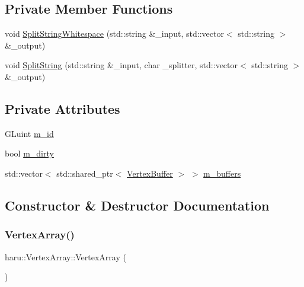 \subsection*{Private Member Functions}
\begin{DoxyCompactItemize}
\item 
void \mbox{\hyperlink{classharu_1_1_vertex_array_a4881c24fdca7f802456d1b8823a0c4ce}{Split\+String\+Whitespace}} (std\+::string \&\+\_\+input, std\+::vector$<$ std\+::string $>$ \&\+\_\+output)
\item 
void \mbox{\hyperlink{classharu_1_1_vertex_array_a8ca455fffbc9f554851fe18eb8a26bfa}{Split\+String}} (std\+::string \&\+\_\+input, char \+\_\+splitter, std\+::vector$<$ std\+::string $>$ \&\+\_\+output)
\end{DoxyCompactItemize}
\subsection*{Private Attributes}
\begin{DoxyCompactItemize}
\item 
G\+Luint \mbox{\hyperlink{classharu_1_1_vertex_array_a61e6c2025f2bb9da20280c6b607e4c22}{m\+\_\+id}}
\item 
bool \mbox{\hyperlink{classharu_1_1_vertex_array_a7cc151adcf4133de6d7130e206e08b9d}{m\+\_\+dirty}}
\item 
std\+::vector$<$ std\+::shared\+\_\+ptr$<$ \mbox{\hyperlink{classharu_1_1_vertex_buffer}{Vertex\+Buffer}} $>$ $>$ \mbox{\hyperlink{classharu_1_1_vertex_array_a66f9492ccad01a67ed2dff56feefef46}{m\+\_\+buffers}}
\end{DoxyCompactItemize}


\subsection{Constructor \& Destructor Documentation}
\mbox{\label{classharu_1_1_vertex_array_a53d1c5c6eb05c265f05ed9d06d748f02}} 
\subsubsection{\texorpdfstring{Vertex\+Array()}{VertexArray()}\hspace{0.1cm}{\footnotesize\ttfamily [1/2]}}
{\footnotesize\ttfamily haru\+::\+Vertex\+Array\+::\+Vertex\+Array (\begin{DoxyParamCaption}{ }\end{DoxyParamCaption})}

